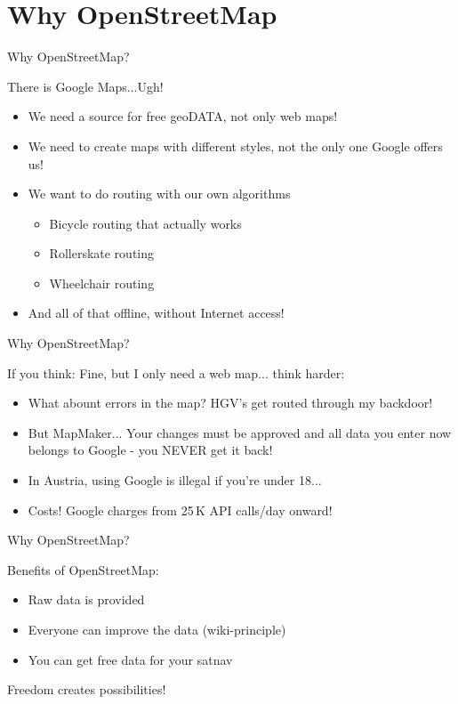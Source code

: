 \documentclass{beamer}
\begin{document}
\section{Why OpenStreetMap}

\begin{frame}{Why OpenStreetMap?}

  There is Google Maps...\pause Ugh!

\begin{itemize}
  \item We need a source for free geoDATA, not only web maps!
  \item We need to create maps with different styles, not the only one Google offers us!
  \item We want to do routing with our own algorithms
  \begin{itemize}
    \item Bicycle routing that actually works
    \item Rollerskate routing
    \item Wheelchair routing
  \end{itemize}
    \pause
  \item And all of that offline, without Internet access!
\end{itemize}

\end{frame}

\begin{frame}{Why OpenStreetMap?}

  If you think: Fine, but I only need a web map... \pause think harder:

\begin{itemize}
  \item What abount errors in the map? \pause HGV's get routed through my backdoor!
  \item But MapMaker... \pause Your changes must be approved and all data you enter now belongs to Google - you NEVER get it back!
    \pause
  \item In Austria, using Google is illegal if you're under 18...
    \pause
  \item Costs! Google charges from 25\,K API calls/day onward!
\end{itemize}

\end{frame}

\begin{frame}{Why OpenStreetMap?}

Benefits of OpenStreetMap:

\begin{itemize}
  \item Raw data is provided
  \item Everyone can improve the data (wiki-principle)
  \item You can get free data for your satnav
\end{itemize}

Freedom creates possibilities!

\end{frame}
\end{document}
